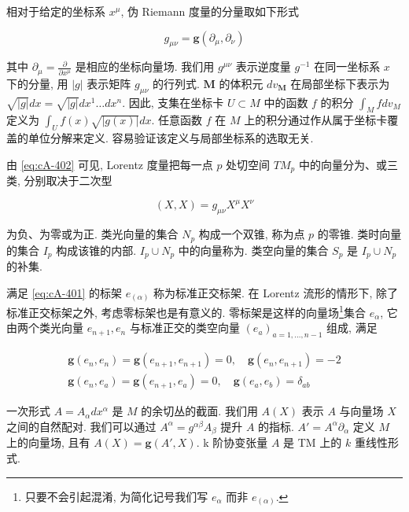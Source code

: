 相对于给定的坐标系 $x^{\mu}$, 伪 Riemann 度量的分量取如下形式

\[
g_{\mu\nu} = \mathbf{g}(\partial_{\mu}, \partial_{\nu})
\]

其中 $\partial_{\mu}=\frac{\partial}{\partial x^{\mu}}$ 是相应的坐标向量场. 我们用 $g^{\mu\nu}$ 表示逆度量 $g^{-1}$ 在同一坐标系 $x$ 下的分量, 用 $|g|$ 表示矩阵 $g_{\mu\nu}$ 的行列式. $\mathbf{M}$ 的体积元 $dv_{\mathbf{M}}$ 在局部坐标下表示为 $\sqrt{|g|}dx=\sqrt{|g|}dx^{1}\ldots dx^{n}$. 因此, 支集在坐标卡 $U\subset M$ 中的函数 $f$ 的积分 $\int_{M}fdv_{M}$ 定义为 $\int_{U}f(x)\sqrt{|g(x)|}dx$. 任意函数 $f$ 在 $M$ 上的积分通过作从属于坐标卡覆盖的单位分解来定义. 容易验证该定义与局部坐标系的选取无关.

由 \eqref{eq:cA-402} 可见, Lorentz 度量把每一点 $p$ 处切空间 $TM_{p}$ 中的向量分为、或三类, 分别取决于二次型

\begin{equation}
(X, X) = g_{\mu\nu} X^{\mu} X^{\nu}\label{eq:cA-403}
\end{equation}

为负、为零或为正. 类光向量的集合 $N_{p}$ 构成一个双锥, 称为点 $p$ 的零锥. 类时向量的集合 $I_{p}$ 构成该锥的内部. $I_{p} \cup N_{p}$ 中的向量称为. 类空向量的集合 $S_{p}$ 是 $I_{p} \cup N_{p}$ 的补集.

满足 \eqref{eq:cA-401} 的标架 $e_{(\alpha)}$ 称为标准正交标架. 在 Lorentz 流形的情形下, 除了标准正交标架之外, 考虑零标架也是有意义的. 零标架是这样的向量场\footnote{只要不会引起混淆, 为简化记号我们写 $e_{\alpha}$ 而非 $e_{(\alpha)}$.}集合 $e_{\alpha}$, 它由两个类光向量 $e_{n+1}, e_{n}$ 与标准正交的类空向量 $(e_{a})_{a=1, \ldots, n-1}$ 组成, 满足

\[
\begin{array}{l}
\mathbf{g}(e_{n}, e_{n}) = \mathbf{g}(e_{n+1}, e_{n+1}) = 0, \quad \mathbf{g}(e_{n}, e_{n+1}) = -2 \\
\mathbf{g}(e_{n}, e_{a}) = \mathbf{g}(e_{n+1}, e_{a}) = 0, \quad \mathbf{g}(e_{a}, e_{b}) = \delta_{ab}
\end{array}
\]

一次形式 $A = A_{\alpha}dx^{\alpha}$ 是 $M$ 的余切丛的截面. 我们用 $A(X)$ 表示 $A$ 与向量场 $X$ 之间的自然配对. 我们可以通过 $A^{\alpha} = g^{\alpha\beta}A_{\beta}$ 提升 $A$ 的指标. $A' = A^{\alpha}\partial_{\alpha}$ 定义 $M$ 上的向量场, 且有 $A(X) = \mathbf{g}(A', X)$. k 阶协变张量 $A$ 是 TM 上的 $k$ 重线性形式.

